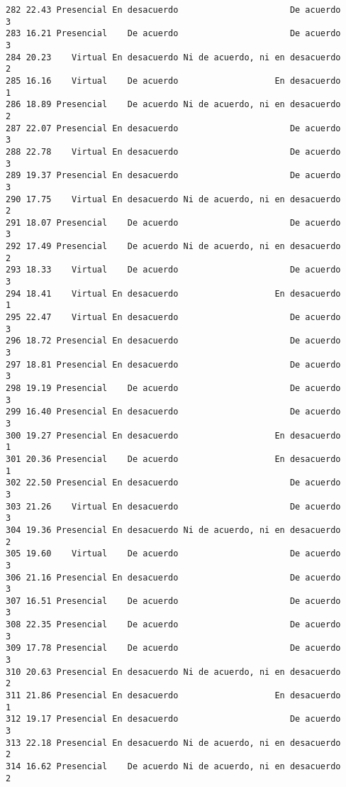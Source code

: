 \documentclass[
  letterpaper,
  DIV=11,
  numbers=noendperiod]{scrartcl}
\begin{document}
\begin{verbatim}
282 22.43 Presencial En desacuerdo                      De acuerdo           3
283 16.21 Presencial    De acuerdo                      De acuerdo           3
284 20.23    Virtual En desacuerdo Ni de acuerdo, ni en desacuerdo           2
285 16.16    Virtual    De acuerdo                   En desacuerdo           1
286 18.89 Presencial    De acuerdo Ni de acuerdo, ni en desacuerdo           2
287 22.07 Presencial En desacuerdo                      De acuerdo           3
288 22.78    Virtual En desacuerdo                      De acuerdo           3
289 19.37 Presencial En desacuerdo                      De acuerdo           3
290 17.75    Virtual En desacuerdo Ni de acuerdo, ni en desacuerdo           2
291 18.07 Presencial    De acuerdo                      De acuerdo           3
292 17.49 Presencial    De acuerdo Ni de acuerdo, ni en desacuerdo           2
293 18.33    Virtual    De acuerdo                      De acuerdo           3
294 18.41    Virtual En desacuerdo                   En desacuerdo           1
295 22.47    Virtual En desacuerdo                      De acuerdo           3
296 18.72 Presencial En desacuerdo                      De acuerdo           3
297 18.81 Presencial En desacuerdo                      De acuerdo           3
298 19.19 Presencial    De acuerdo                      De acuerdo           3
299 16.40 Presencial En desacuerdo                      De acuerdo           3
300 19.27 Presencial En desacuerdo                   En desacuerdo           1
301 20.36 Presencial    De acuerdo                   En desacuerdo           1
302 22.50 Presencial En desacuerdo                      De acuerdo           3
303 21.26    Virtual En desacuerdo                      De acuerdo           3
304 19.36 Presencial En desacuerdo Ni de acuerdo, ni en desacuerdo           2
305 19.60    Virtual    De acuerdo                      De acuerdo           3
306 21.16 Presencial En desacuerdo                      De acuerdo           3
307 16.51 Presencial    De acuerdo                      De acuerdo           3
308 22.35 Presencial    De acuerdo                      De acuerdo           3
309 17.78 Presencial    De acuerdo                      De acuerdo           3
310 20.63 Presencial En desacuerdo Ni de acuerdo, ni en desacuerdo           2
311 21.86 Presencial En desacuerdo                   En desacuerdo           1
312 19.17 Presencial En desacuerdo                      De acuerdo           3
313 22.18 Presencial En desacuerdo Ni de acuerdo, ni en desacuerdo           2
314 16.62 Presencial    De acuerdo Ni de acuerdo, ni en desacuerdo           2

\end{verbatim}
\end{document}
